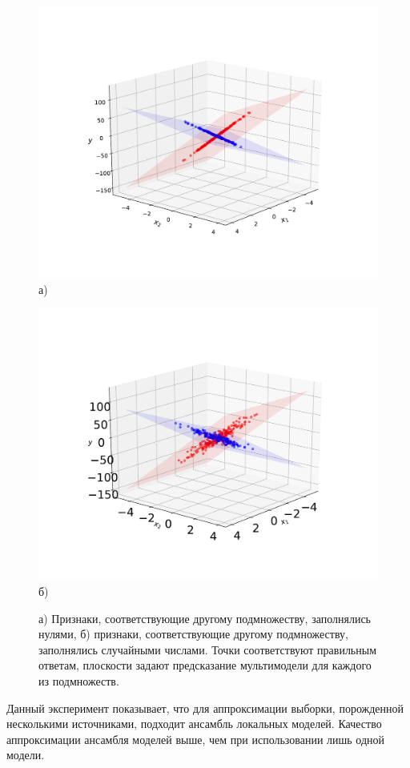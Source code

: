 \documentclass[12pt, twoside]{article}
\begin{document}
\begin{figure}[h]
\begin{center}
\begin{minipage}[h]{0.49\linewidth}
\begin{center}\includegraphics[width=1.2\linewidth]{experiment2-zeros.pdf}  а) \end{center}
\end{minipage}
\hfill
\begin{minipage}[h]{0.49\linewidth}
\begin{center}\includegraphics[width=1.2\linewidth]{experiment2-random.pdf}  б) \end{center}
\end{minipage}
\caption{а) Признаки, соответствующие другому подмножеству, заполнялись нулями, б) признаки, соответствующие другому подмножеству, заполнялись случайными числами. Точки соответствуют правильным ответам, плоскости задают предсказание мультимодели для каждого из подмножеств.}
\label{ris:image1}
\end{center}
\end{figure}

Данный эксперимент показывает, что для аппроксимации выборки, порожденной несколькими источниками, подходит ансамбль локальных моделей. Качество аппроксимации ансамбля моделей выше, чем при использовании лишь одной модели. 




\end{document}
